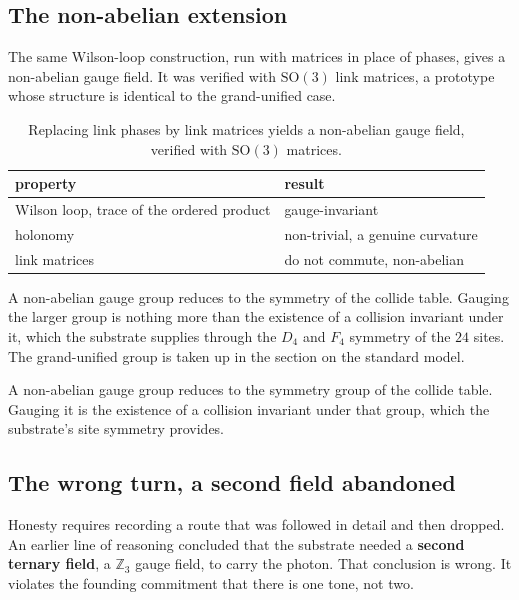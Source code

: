 \subsection{The non-abelian extension}

The same Wilson-loop construction, run with matrices in place of phases, gives a non-abelian gauge field. It was verified with $\mathrm{SO}(3)$ link matrices, a prototype whose structure is identical to the grand-unified case.

\begin{table}[ht]
\centering
\begin{tabular}{@{}ll@{}}
\toprule
property & result \\
\midrule
Wilson loop, trace of the ordered product & gauge-invariant \\
holonomy & non-trivial, a genuine curvature \\
link matrices & do not commute, non-abelian \\
\bottomrule
\end{tabular}
\caption{Replacing link phases by link matrices yields a non-abelian gauge field, verified with $\mathrm{SO}(3)$ matrices.}
\label{tab:nonabelian}
\end{table}

A non-abelian gauge group reduces to the symmetry of the collide table. Gauging the larger group is nothing more than the existence of a collision invariant under it, which the substrate supplies through the $D_4$ and $F_4$ symmetry of the $24$ sites. The grand-unified group is taken up in the section on the standard model.

\begin{principle}
A non-abelian gauge group reduces to the symmetry group of the collide table. Gauging it is the existence of a collision invariant under that group, which the substrate's site symmetry provides.
\end{principle}

\subsection{The wrong turn, a second field abandoned}

Honesty requires recording a route that was followed in detail and then dropped. An earlier line of reasoning concluded that the substrate needed a \textbf{second ternary field}, a $\mathbb{Z}_3$ gauge field, to carry the photon. That conclusion is wrong. It violates the founding commitment that there is one tone, not two.

